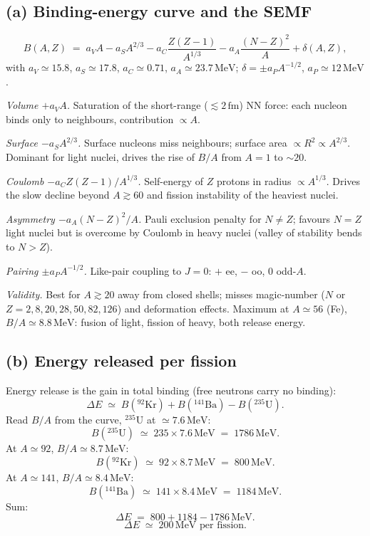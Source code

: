 \documentclass[11pt]{article}
\begin{document}
\subsection*{(a) Binding-energy curve and the SEMF}

\begin{equation}
B(A,Z)\;=\;a_{V}A-a_{S}A^{2/3}-a_{C}\frac{Z(Z-1)}{A^{1/3}}-a_{A}\frac{(N-Z)^{2}}{A}+\delta(A,Z),
\label{eq:SEMF}
\end{equation}
with $a_{V}\!\simeq\!15.8$, $a_{S}\!\simeq\!17.8$, $a_{C}\!\simeq\!0.71$, $a_{A}\!\simeq\!23.7\,\text{MeV}$; $\delta=\pm a_{P}A^{-1/2}$, $a_{P}\simeq 12\,\text{MeV}$.

\emph{Volume $+a_{V}A$.} Saturation of the short-range (${\lesssim}2\,\text{fm}$) NN force: each nucleon binds only to neighbours, contribution $\propto A$.

\emph{Surface $-a_{S}A^{2/3}$.} Surface nucleons miss neighbours; surface area $\propto R^{2}\propto A^{2/3}$. Dominant for light nuclei, drives the rise of $B/A$ from $A=1$ to ${\sim}20$.

\emph{Coulomb $-a_{C}Z(Z-1)/A^{1/3}$.} Self-energy of $Z$ protons in radius $\propto A^{1/3}$. Drives the slow decline beyond $A\!\gtrsim\!60$ and fission instability of the heaviest nuclei.

\emph{Asymmetry $-a_{A}(N-Z)^{2}/A$.} Pauli exclusion penalty for $N\neq Z$; favours $N=Z$ light nuclei but is overcome by Coulomb in heavy nuclei (valley of stability bends to $N>Z$).

\emph{Pairing $\pm a_{P}A^{-1/2}$.} Like-pair coupling to $J=0$: $+$ ee, $-$ oo, 0 odd-$A$.

\emph{Validity.} Best for $A\gtrsim 20$ away from closed shells; misses magic-number ($N$ or $Z=2,8,20,28,50,82,126$) and deformation effects. Maximum at $A\simeq 56$ (Fe), $B/A\simeq 8.8\,\text{MeV}$: fusion of light, fission of heavy, both release energy.

\subsection*{(b) Energy released per fission}

Energy release is the gain in total binding (free neutrons carry no binding):
\[
\Delta E\;\simeq\;B(^{92}\text{Kr})+B(^{141}\text{Ba})-B(^{235}\text{U}).
\]
Read $B/A$ from the curve, $^{235}\text{U}$ at $\simeq 7.6\,\text{MeV}$:
\[
B(^{235}\text{U})\;\simeq\;235\times 7.6\,\text{MeV}\;=\;1786\,\text{MeV}.
\]
At $A\simeq 92$, $B/A\simeq 8.7\,\text{MeV}$:
\[
B(^{92}\text{Kr})\;\simeq\;92\times 8.7\,\text{MeV}\;=\;800\,\text{MeV}.
\]
At $A\simeq 141$, $B/A\simeq 8.4\,\text{MeV}$:
\[
B(^{141}\text{Ba})\;\simeq\;141\times 8.4\,\text{MeV}\;=\;1184\,\text{MeV}.
\]
Sum:
\[
\Delta E\;=\;800+1184-1786\,\text{MeV}.
\]
\begin{equation}
\boxed{\;\Delta E\;\simeq\;200\,\text{MeV}\text{ per fission}.\;}
\end{equation}
\end{document}
